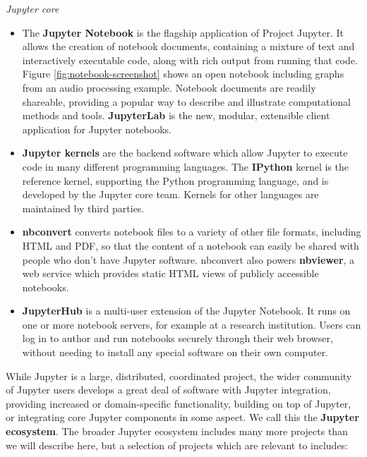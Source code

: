 \medskip\noindent\emph{Jupyter core}
\begin{itemize}
  \item The \textbf{Jupyter Notebook} is the flagship application of Project Jupyter.
  It allows the creation of notebook documents, containing a mixture of text and
  interactively executable code, along with rich output from running that code.
  Figure \ref{fig:notebook-screenshot} shows an open notebook including graphs
  from an audio processing example. Notebook documents are readily shareable,
  providing a popular way to describe and illustrate computational methods and
  tools.
  \textbf{JupyterLab} is the new, modular, extensible client application
  for Jupyter notebooks.

  \item \textbf{Jupyter kernels} are the backend software which allow Jupyter to execute
  code in many different programming languages. The \textbf{IPython} kernel is
  the reference kernel, supporting the Python programming language, and is
  developed by the Jupyter core team. Kernels for other languages are maintained
  by third parties.

  \item \textbf{nbconvert} converts notebook files to a variety of other file
  formats, including HTML and PDF, so that the content of a notebook can easily
  be shared with people who don't have Jupyter software. nbconvert also powers
  \textbf{nbviewer}, a web service which provides static HTML views of publicly
  accessible notebooks.

  \item \textbf{JupyterHub} is a multi-user extension of the Jupyter Notebook.
  It runs on one or more notebook servers, for example at a research institution.
  Users can log in to author and run notebooks securely through their web
  browser, without needing to install any special software on their own
  computer.

\end{itemize}

While Jupyter is a large, distributed, coordinated project,
the wider community of Jupyter users develops a great deal of
software with Jupyter integration,
providing increased or domain-specific functionality,
building on top of Jupyter, or integrating core Jupyter components in some aspect.
We call this the \textbf{Jupyter ecosystem}.
The broader Jupyter ecosystem includes many more projects than we will describe
here, but a selection of projects which are relevant to
\TheProject includes:

